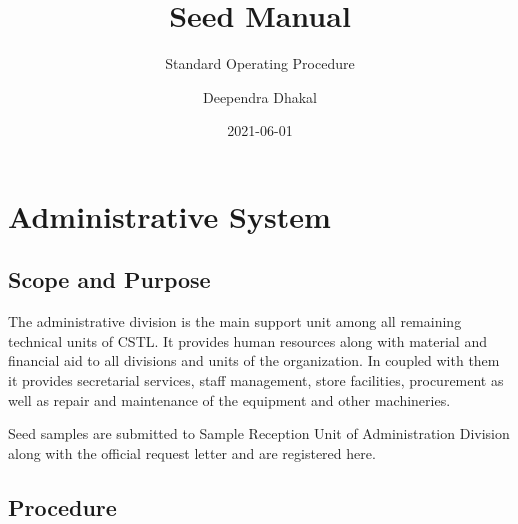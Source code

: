 \documentclass[
]{book}
\title{Seed Manual}
\subtitle{Standard Operating Procedure}
\author{Deependra Dhakal}
\date{2021-06-01}
\begin{document}
\maketitle

{
\setcounter{tocdepth}{1}
\tableofcontents
}
\hypertarget{adminsys}{%
\chapter{Administrative System}\label{adminsys}}

\hypertarget{scope-and-purpose}{%
\section{Scope and Purpose}\label{scope-and-purpose}}

The administrative division is the main support unit among all remaining technical units of CSTL. It provides human resources along with material and financial aid to all divisions and units of the organization. In coupled with them it provides secretarial services, staff management, store facilities, procurement as well as repair and maintenance of the equipment and other machineries.

Seed samples are submitted to Sample Reception Unit of Administration Division along with the official request letter and are registered here.

\hypertarget{procedure}{%
\section{Procedure}\label{procedure}}
\end{document}
